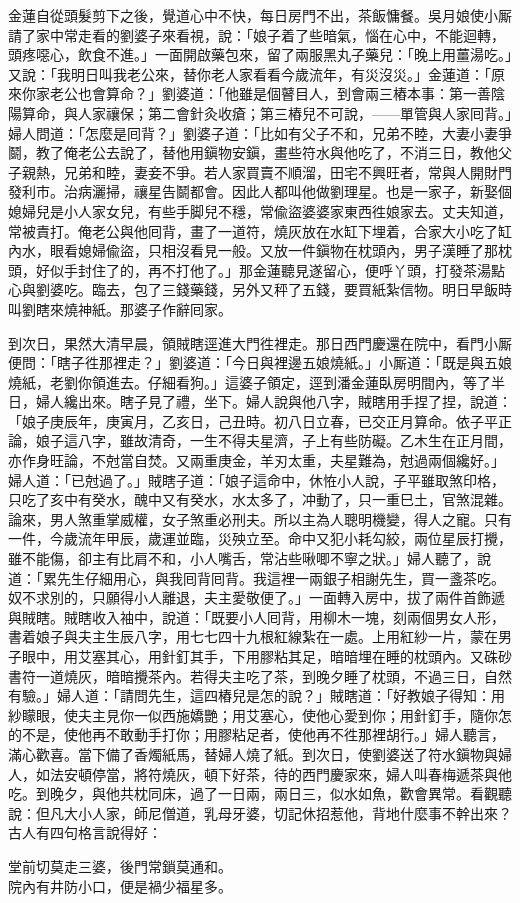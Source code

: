 金蓮自從頭髮剪下之後，覺道心中不快，每日房門不出，茶飯慵餐。吳月娘使小厮請了家中常走看的劉婆子來看視，說：「娘子着了些暗氣，惱在心中，不能迴轉，頭疼噁心，飲食不進。」一面開啟藥包來，留了兩服黑丸子藥兒：「晚上用薑湯吃。」又說：「我明日叫我老公來，替你老人家看看今歲流年，有災沒災。」金蓮道：「原來你家老公也會算命？」劉婆道：「他雖是個瞽目人，到會兩三樁本事：第一善陰陽算命，與人家禳保；第二會針灸收瘡；第三樁兒不可說，{}——單管與人家囘背。」婦人問道：「怎麼是囘背？」劉婆子道：「比如有父子不和，兄弟不睦，{}大妻小妻爭鬬，教了俺老公去說了，替他用鎭物安鎭，畫些符水與他吃了，不消三日，教他父子親熱，兄弟和睦，妻妾不爭。若人家買賣不順溜，田宅不興旺者，{}常與人開財門發利市。治病灑掃，禳星告鬬都會。因此人都叫他做劉理星。也是一家子，新娶個媳婦兒是小人家女兒，有些手脚兒不穩，常偸盜婆婆家東西徃娘家去。丈夫知道，常被責打。俺老公與他囘背，畫了一道符，燒灰放在水缸下埋着，合家大小吃了缸內水，眼看媳婦偸盜，只相沒看見一般。{}又放一件鎭物在枕頭內，男子漢睡了那枕頭，好似手封住了的，再不打他了。」那金蓮聽見遂留心，便呼丫頭，打發茶湯點心與劉婆吃。臨去，包了三錢藥錢，另外又秤了五錢，要買紙紮信物。明日早飯時叫劉瞎來燒神紙。那婆子作辭囘家。

到次日，果然大清早晨，領賊瞎逕進大門徃裡走。那日西門慶還在院中，看門小厮便問：「瞎子徃那裡走？」劉婆道：「今日與裡邊五娘燒紙。」小厮道：「既是與五娘燒紙，老劉你領進去。仔細看狗。」這婆子領定，逕到潘金蓮臥房明間內，等了半日，婦人纔出來。瞎子見了禮，坐下。婦人說與他八字，賊瞎用手捏了捏，說道：「娘子庚辰年，庚寅月，乙亥日，己丑時。初八日立春，已交正月算命。依子平正論，娘子這八字，雖故清奇，一生不得夫星濟，子上有些防礙。乙木生在正月間，亦作身旺論，不尅當自焚。又兩重庚金，羊刃太重，夫星難為，尅過兩個纔好。」婦人道：「已尅過了。」賊瞎子道：「娘子這命中，休恠小人說，子平雖取煞印格，只吃了亥中有癸水，醜中又有癸水，水太多了，冲動了，只一重巳土，官煞混雜。論來，男人煞重掌威權，女子煞重必刑夫。所以主為人聰明機變，得人之寵。只有一件，今歲流年甲辰，歲運並臨，災殃立至。命中又犯小耗勾絞，兩位星辰打攪，雖不能傷，卻主有比肩不和，小人嘴舌，常沾些啾唧不寧之狀。」婦人聽了，說道：「累先生仔細用心，與我囘背囘背。我這裡一兩銀子相謝先生，買一盞茶吃。奴不求別的，只願得小人離退，夫主愛敬便了。」一面轉入房中，拔了兩件首飾遞與賊瞎。賊瞎收入袖中，說道：「既要小人囘背，用柳木一塊，刻兩個男女人形，書着娘子與夫主生辰八字，用七七四十九根紅線紮在一處。上用紅紗一片，蒙在男子眼中，用艾塞其心，用針釘其手，下用膠粘其足，暗暗埋在睡的枕頭內。又硃砂書符一道燒灰，暗暗攪茶內。若得夫主吃了茶，到晚夕睡了枕頭，不過三日，自然有驗。」婦人道：「請問先生，這四樁兒是怎的說？」賊瞎道：「好教娘子得知：用紗矇眼，使夫主見你一似西施嬌艷；用艾塞心，使他心愛到你；用針釘手，隨你怎的不是，使他再不敢動手打你；用膠粘足者，使他再不徃那裡胡行。」{}婦人聽言，滿心歡喜。當下備了香燭紙馬，替婦人燒了紙。到次日，使劉婆送了符水鎭物與婦人，如法安頓停當，將符燒灰，頓下好茶，待的西門慶家來，婦人叫春梅遞茶與他吃。到晚夕，與他共枕同床，過了一日兩，兩日三，似水如魚，歡會異常。看觀聽說：但凡大小人家，師尼僧道，乳母牙婆，切記休招惹他，背地什麼事不幹出來？古人有四句格言說得好：

\begin{myquote}
堂前切莫走三婆，後門常鎖莫通和。\\院內有井防小口，便是禍少福星多。
\end{myquote}

